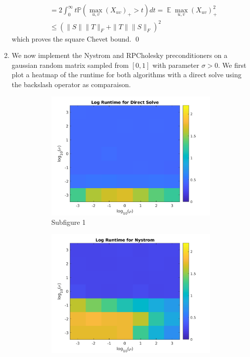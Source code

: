 \documentclass[12pt,letterpaper]{article}
\newcommand{\E}{\Expect}
\renewcommand{\P}{\mathbb{P}}
\newcommand{\Expect}{\operatorname{\mathbb{E}}}
\begin{document}
\begin{enumerate}
\begin{align*}
&= 2\int^{\infty}_{0}t\P\left(\max_{u,v}(X_{uv})_{+}>t\right)dt  = \E\max_{u,v} (X_{uv})^{2}_{+} \\ &\leq (\|S\|\|T\|_{F}+\|T\|\|S\|_{F})^{2}
\end{align*}
which proves the square Chevet bound. \qed 
\item 
We now implement the Nystrom and RPCholesky preconditioners on a gaussian random matrix sampled from 
$[0,1]$ with parameter $\sigma >0$. We first plot a heatmap of the runtime for both algorithms with a direct solve
using the backslash operator as comparaison.

\begin{figure}[ht]
    \centering
    \begin{subfigure}[t]{0.3\textwidth}
        \centering
        \includegraphics[width=\textwidth]{plots/dir1.png}
        \caption{Subfigure 1}
        \label{fig:sub1}
    \end{subfigure}
    \hfill
    \begin{subfigure}[t]{0.3\textwidth}
        \centering
        \includegraphics[width=\textwidth]{plots/nys1.png}

\end{subfigure}
\end{figure}
\end{enumerate}
\end{document}

